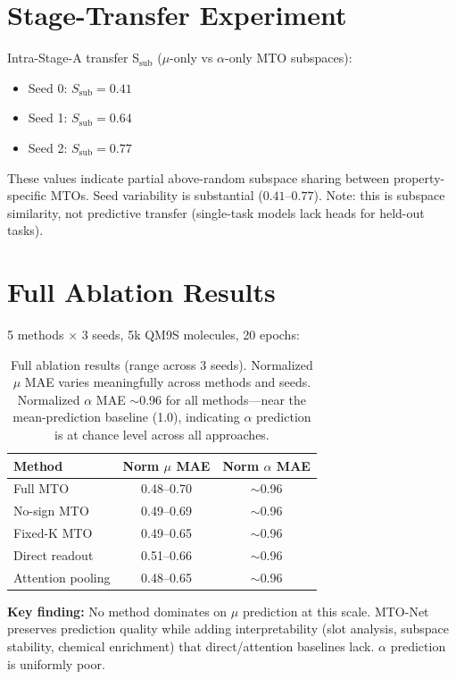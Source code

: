 \documentclass[11pt,a4paper]{article}
\begin{document}
\section{Stage-Transfer Experiment}

Intra-Stage-A transfer S$_\text{sub}$ ($\mu$-only vs $\alpha$-only MTO subspaces):

\begin{itemize}[nosep]
    \item Seed 0: $S_\text{sub} = 0.41$
    \item Seed 1: $S_\text{sub} = 0.64$
    \item Seed 2: $S_\text{sub} = 0.77$
\end{itemize}

These values indicate partial above-random subspace sharing between property-specific MTOs. Seed variability is substantial ($0.41$--$0.77$). Note: this is subspace similarity, not predictive transfer (single-task models lack heads for held-out tasks).

\section{Full Ablation Results}

5 methods $\times$ 3 seeds, 5k QM9S molecules, 20 epochs:

\begin{table}[ht]
\centering
\begin{tabular}{lcc}
\toprule
\textbf{Method} & \textbf{Norm $\mu$ MAE} & \textbf{Norm $\alpha$ MAE} \\
\midrule
Full MTO            & 0.48--0.70 & $\sim$0.96 \\
No-sign MTO         & 0.49--0.69 & $\sim$0.96 \\
Fixed-K MTO         & 0.49--0.65 & $\sim$0.96 \\
Direct readout      & 0.51--0.66 & $\sim$0.96 \\
Attention pooling   & 0.48--0.65 & $\sim$0.96 \\
\bottomrule
\end{tabular}
\caption{Full ablation results (range across 3 seeds). Normalized $\mu$ MAE varies meaningfully across methods and seeds. Normalized $\alpha$ MAE $\sim$0.96 for all methods---near the mean-prediction baseline (1.0), indicating $\alpha$ prediction is at chance level across all approaches.}
\end{table}

\textbf{Key finding:} No method dominates on $\mu$ prediction at this scale. MTO-Net preserves prediction quality while adding interpretability (slot analysis, subspace stability, chemical enrichment) that direct/attention baselines lack. $\alpha$ prediction is uniformly poor.
\end{document}
